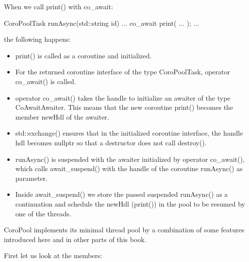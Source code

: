 When we call print() with co\_await:

\begin{cpp}
CoroPoolTask runAsync(std::string id)
{
	...
	co_await print( ... );
	...
}
\end{cpp}

the following happens:

\begin{itemize}
\item
print() is called as a coroutine and initialized. 

\item 
For the returned coroutine interface of the type CoroPoolTask, operator co\_await() is called.

\item 
operator co\_await() takes the handle to initialize an awaiter of the type CoAwaitAwaiter. This means that the new coroutine print() becomes the member newHdl of the awaiter.

\item 
std::exchange() ensures that in the initialized coroutine interface, the handle hdl becomes nullptr so that a destructor does not call destroy().

\item 
runAsync() is suspended with the awaiter initialized by operator co\_await(), which calls await\_suspend() with the handle of the coroutine runAsync() as parameter.

\item 
Inside await\_suspend() we store the passed suspended runAsync() as a continuation and schedule the newHdl (print()) in the pool to be resumed by one of the threads.
\end{itemize}


CoroPool implements its minimal thread pool by a combination of some features introduced here and in other parts of this book.

First let us look at the members:

